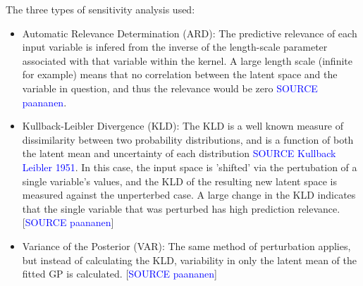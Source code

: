 \documentclass[a4paper, twoside, final, 12pt]{article}
\begin{document}
The three types of sensitivity analysis used:
	\begin{itemize}
		\item Automatic Relevance Determination (ARD): The predictive relevance of each input variable is infered from the inverse of the length-scale parameter associated with that variable within the kernel. A large length scale (infinite for example) means that no correlation between the latent space and the variable in question, and thus the relevance would be zero \textcolor{blue}{SOURCE paananen}. 
		\item Kullback-Leibler Divergence (KLD): The KLD is a well known measure of dissimilarity between two probability distributions, and is a function of both the latent mean and uncertainty of each distribution \textcolor{blue}{SOURCE Kullback Leibler 1951}. In this case, the input space is 'shifted' via the pertubation of a single variable's values, and the KLD of the resulting new latent space is measured against the unperterbed case. A large change in the KLD indicates that the single variable that was perturbed has high prediction relevance.  [\textcolor{blue}{SOURCE paananen}]
		\item Variance of the Posterior (VAR): The same method of perturbation applies, but instead of calculating the KLD, variability in  only the latent mean of the fitted GP is calculated. [\textcolor{blue}{SOURCE paananen}]
	\end{itemize}
\end{document}
